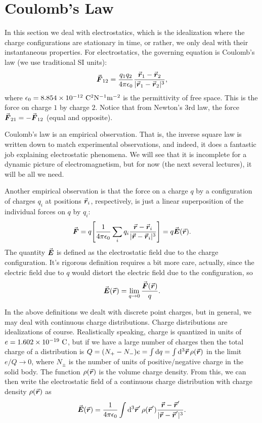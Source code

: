 \chapter{Coulomb's Law}

In this section we deal with electrostatics, which is the idealization where the charge configurations are stationary in time, or rather, we only deal with their instantaneous properties.
For electrostatics, the governing equation is Coulomb's law (we use traditional SI units):
\begin{eqnarray}
    \va*{F}_{12} = \frac{q_1 q_2}{4 \pi \epsilon_0} \frac{\va*{r}_{1} - \va*{r}_{2}}{|\va*{r}_{1} - \va*{r}_{2}|^3}
,\end{eqnarray}
where $\epsilon_0 = 8.854 \times 10^{-12}~{\rm C^2 N^{-1} m^{-2}}$ is the permittivity of free space.
This is the force on charge $1$ by charge $2$.
Notice that from Newton's 3rd law, the force $\va*{F}_{21} = -\va*{F}_{12}$ (equal and opposite).

Coulomb's law is an empirical observation.
That is, the inverse square law is written down to match experimental observations, and indeed, it does a fantastic job explaining electrostatic phenomena.
We will see that it is incomplete for a dynamic picture of electromagnetism, but for now (the next several lectures), it will be all we need.

Another empirical observation is that the force on a charge $q$ by a configuration of charges $q_{i}$ at positions $\va*{r}_{i}$, respectively, is just a linear superposition of the individual forces on $q$ by $q_{i}$:
\begin{eqnarray}
    \va*{F} = q \Bigg[ \frac{1}{4 \pi \epsilon_0} \sum_{i} q_{i} \frac{\va*{r} - \va*{r}_{i}}{|\va*{r} - \va*{r}_{i}|^3} \Bigg] = q \va*{E}(\va*{r})
.\end{eqnarray}
The quantity $\va*{E}$ is defined as the electrostatic field due to the charge configuration.
It's rigorous definition requires a bit more care, actually, since the electric field due to $q$ would distort the electric field due to the configuration, so
\begin{eqnarray}
    \va*{E}(\va*{r}) = \lim_{q \rightarrow 0} \frac{\va*{F}(\va*{r})}{q}
.\end{eqnarray}

In the above definitions we dealt with discrete point charges, but in general, we may deal with continuous charge distributions.
Charge distributions are idealizations of course. 
Realistically speaking, charge is quantized in units of $e = 1.602 \times 10^{-19}~{\rm C}$, but if we have a large number of charges then the total charge of a distribution is $Q = (N_{+} - N_{-})e = \int \dd{q} = \int \dd[3]{\va*{r}} \rho(\va*{r})$ in the limit $e/Q \rightarrow 0$, where $N_{\pm}$ is the number of units of positive/negative charge in the solid body.
The function $\rho(\va*{r})$ is the volume charge density.
From this, we can then write the electrostatic field of a continuous charge distribution with charge density $\rho(\va*{r})$ as
\begin{eqnarray}
    \va*{E}(\va*{r}) = \frac{1}{4 \pi \epsilon_0} \int \dd[3]{\va*{r}'} \rho(\va*{r}') \frac{\va*{r} - \va*{r}'}{|\va*{r} - \va*{r}'|^3}
.\end{eqnarray}


